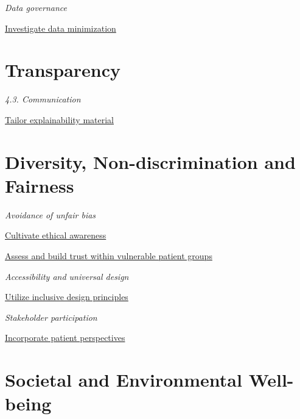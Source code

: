 \documentclass[
  letterpaper,
  DIV=11,
  numbers=noendperiod]{scrreport}
\begin{document}

\emph{Data governance}

\protect\hyperlink{investigate-data-minimization}{Investigate data
minimization}

\hypertarget{transparency-2}{%
\section*{Transparency}\label{transparency-2}}


\emph{4.3. Communication}

\protect\hyperlink{tailor-explainability-material}{Tailor explainability
material}

\hypertarget{diversity-non-discrimination-and-fairness-2}{%
\section*{Diversity, Non-discrimination and
Fairness}\label{diversity-non-discrimination-and-fairness-2}}


\emph{Avoidance of unfair bias}

\protect\hyperlink{cultivate-ethical-awareness}{Cultivate ethical
awareness}

\protect\hyperlink{assess-and-build-trust-within-vulnerable-patient-groups}{Assess
and build trust within vulnerable patient groups}

\emph{Accessibility and universal design}

\protect\hyperlink{utilize-inclusive-design-principles}{Utilize
inclusive design principles}

\emph{Stakeholder participation}

\protect\hyperlink{incorporate-patient-perspectives}{Incorporate patient
perspectives}

\hypertarget{societal-and-environmental-well-being-2}{%
\section*{Societal and Environmental
Well-being}\label{societal-and-environmental-well-being-2}}

\end{document}
